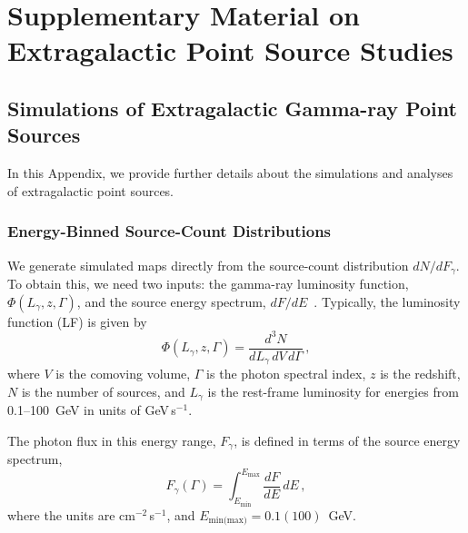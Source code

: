 \chapter{Supplementary Material on Extragalactic Point Source Studies}

\section{Simulations of Extragalactic Gamma-ray Point Sources}
In this Appendix, we provide further details about the simulations and analyses of extragalactic point sources.

\subsection{Energy-Binned Source-Count Distributions}
\label{app:sims}

We generate simulated maps directly from the source-count distribution $dN/dF_{\gamma}$. To obtain this, we need two inputs: the gamma-ray luminosity function, $\Phi(L_{\gamma},z,\Gamma)$, and the source energy spectrum, $dF/dE$~\cite{DiMauro:2014wha}.  Typically, the luminosity function (LF) is given by
\begin{equation}
\Phi(L_{\gamma},z,\Gamma)=\frac{d^3N}{dL_\gamma\,dV\,d\Gamma} \,  ,
\end{equation}
where $V$ is the comoving volume, $\Gamma$ is the photon spectral index, $z$ is the redshift, $N$ is the number of sources, and $L_\gamma$ is the rest-frame luminosity for energies from 0.1--100~GeV in units of GeV\,s$^{-1}$.     

The photon flux in this energy range, $F_\gamma$, 
is defined in terms of the source energy spectrum,
\begin{equation}
F_\gamma(\Gamma) = \int_{E_\text{min}}^{E_\text{max}}\frac{dF}{dE} \, dE \, ,
\label{eq: Fgamma}
\end{equation}
where the units are cm$^{-2}$\,s$^{-1}$, and $E_\text{min(max)} = 0.1(100)$~GeV.

